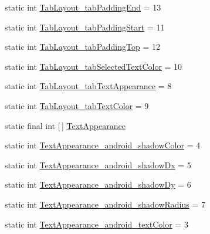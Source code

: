 \begin{DoxyCompactItemize}
\item 
static int \hyperlink{classandroid_1_1support_1_1v7_1_1mediarouter_1_1R_1_1styleable_a4dcd3a733efad4f87d80f65b2a766010}{Tab\+Layout\+\_\+tab\+Padding\+End} = 13
\item 
static int \hyperlink{classandroid_1_1support_1_1v7_1_1mediarouter_1_1R_1_1styleable_a28354c7081791e6f352bb7b9963d4115}{Tab\+Layout\+\_\+tab\+Padding\+Start} = 11
\item 
static int \hyperlink{classandroid_1_1support_1_1v7_1_1mediarouter_1_1R_1_1styleable_a618b0933d1820264a2c2a9ce7e411adc}{Tab\+Layout\+\_\+tab\+Padding\+Top} = 12
\item 
static int \hyperlink{classandroid_1_1support_1_1v7_1_1mediarouter_1_1R_1_1styleable_ab2614637dac3cf097bf39bb86f81cddf}{Tab\+Layout\+\_\+tab\+Selected\+Text\+Color} = 10
\item 
static int \hyperlink{classandroid_1_1support_1_1v7_1_1mediarouter_1_1R_1_1styleable_a6fa243786142fa47217b312962fc4848}{Tab\+Layout\+\_\+tab\+Text\+Appearance} = 8
\item 
static int \hyperlink{classandroid_1_1support_1_1v7_1_1mediarouter_1_1R_1_1styleable_a0fcf5d47b23b3827d92116fbdb4b4028}{Tab\+Layout\+\_\+tab\+Text\+Color} = 9
\item 
static final int \mbox{[}$\,$\mbox{]} \hyperlink{classandroid_1_1support_1_1v7_1_1mediarouter_1_1R_1_1styleable_afa2418a8445abd4ca0361d2d60e02f3d}{Text\+Appearance}
\item 
static int \hyperlink{classandroid_1_1support_1_1v7_1_1mediarouter_1_1R_1_1styleable_a6b97baff4bc894f0d6c987535d7f3a5a}{Text\+Appearance\+\_\+android\+\_\+shadow\+Color} = 4
\item 
static int \hyperlink{classandroid_1_1support_1_1v7_1_1mediarouter_1_1R_1_1styleable_a81de478b4358f0d70081daf1c09c22be}{Text\+Appearance\+\_\+android\+\_\+shadow\+Dx} = 5
\item 
static int \hyperlink{classandroid_1_1support_1_1v7_1_1mediarouter_1_1R_1_1styleable_a89a0ca76b46147ac109fdca933ba7ae0}{Text\+Appearance\+\_\+android\+\_\+shadow\+Dy} = 6
\item 
static int \hyperlink{classandroid_1_1support_1_1v7_1_1mediarouter_1_1R_1_1styleable_aaa832bf0610d5cc0cce43c775bdea573}{Text\+Appearance\+\_\+android\+\_\+shadow\+Radius} = 7
\item 
static int \hyperlink{classandroid_1_1support_1_1v7_1_1mediarouter_1_1R_1_1styleable_a650b9a9477f454927072818d18f15b8c}{Text\+Appearance\+\_\+android\+\_\+text\+Color} = 3
\item 

\end{DoxyCompactItemize}
